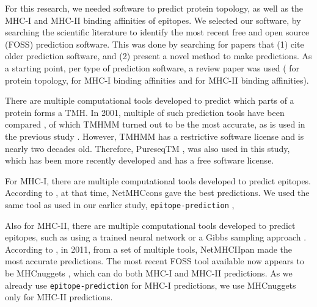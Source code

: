 For this research, we needed software to predict protein
topology, as well as the MHC-I and MHC-II binding affinities
of epitopes. We selected our software, by
searching the scientific literature 
to identify the most recent free and open source (FOSS) 
prediction software.
This was done by searching for papers that (1) cite older
prediction software, and (2) present a novel method to make predictions.
As a starting point, per type of prediction software,
a review paper was used (\cite{moller2001evaluation} for protein
topology, \cite{lundegaard2011prediction} for MHC-I
binding affinities and \cite{nielsen2003reliable} for MHC-II binding
affinities). 


There are multiple computational tools developed to predict which
parts of a protein forms a TMH.
In 2001, multiple of such prediction tools have been compared \cite{moller2001evaluation},
of which TMHMM \cite{krogh2001predicting} turned out to be the most accurate, 
as is used in the previous study \cite{bianchi2017}.
However, TMHMM has a restrictive software license and is nearly two
decades old.
Therefore, PureseqTM \cite{wang2019efficient},
was also used in this study, which has been more recently developed
and has a free software license.


For MHC-I, there are multiple computational tools developed 
to predict epitopes. 
According to \cite{lundegaard2011prediction}, at that time,
NetMHCcons \cite{karosiene2012netmhccons} gave the best predictions.
We used the same tool as used in our earlier study, 
\verb;epitope-prediction; \cite{bianchi2017},


Also for MHC-II, there are multiple computational tools developed 
to predict epitopes,
such as using a trained neural network \cite{nielsen2003reliable}
or a Gibbs sampling approach \cite{nielsen2004improved}.
According to \cite{lundegaard2011prediction}, in 2011,
from a set of multiple tools, 
\mbox{NetMHCIIpan} \cite{nielsen2008quantitative,karosiene2013netmhciipan}
made the most accurate predictions.
The most recent FOSS tool available now appears
to be MHCnuggets \cite{shao2020high}, which can do both MHC-I 
and MHC-II predictions. 
As we already use \verb;epitope-prediction; \cite{bianchi2017} 
for MHC-I predictions, we use MHCnuggets only for MHC-II predictions.

